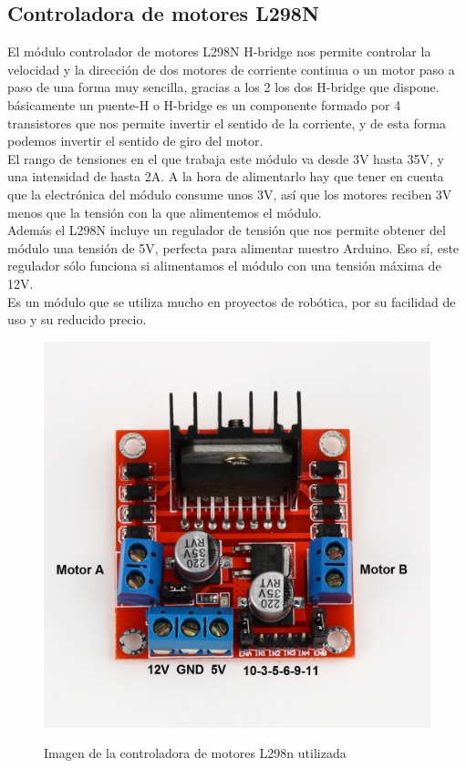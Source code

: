 \subsection{Controladora de motores L298N}


El módulo controlador de motores L298N H-bridge nos permite controlar la velocidad y la dirección de dos motores de corriente continua o un motor paso a paso de una forma muy sencilla,
gracias a los 2 los dos H-bridge que dispone.\\

básicamente un puente-H o H-bridge es un componente formado por 4 transistores que nos permite invertir el sentido de la corriente, y de esta forma podemos 
invertir el sentido de giro del motor.\\

El rango de tensiones en el que trabaja este módulo va desde 3V hasta 35V, y una intensidad de hasta 2A. A la hora de alimentarlo hay que tener en cuenta que la 
electrónica del módulo consume unos 3V, así que los motores reciben 3V menos que la tensión con la que alimentemos el módulo.\\

Además el L298N incluye un regulador de tensión que nos permite obtener del módulo una tensión de 5V, perfecta para alimentar nuestro Arduino. Eso sí, este regulador sólo 
funciona si alimentamos el módulo con una tensión máxima de 12V.\\

Es un módulo que se utiliza mucho en proyectos de robótica, por su facilidad de uso y su reducido precio.

\begin{figure}[H]
  \begin{center}
    \includegraphics[scale=0.6]{imagenes/l298n.jpg}\\
    \caption{Imagen de la controladora de motores L298n utilizada}
  \end{center}
\end{figure}



